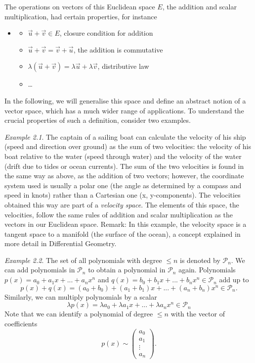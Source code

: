 \documentclass[
  letterpaper,
  DIV=11,
  numbers=noendperiod]{scrartcl}
\providecommand{\tightlist}{%
  \setlength{\itemsep}{0pt}\setlength{\parskip}{0pt}}
\theoremstyle{remark}
\begin{document}
The operations on vectors of this Euclidean space \(E\), the addition
and scalar multiplication, had certain properties, for instance

\begin{itemize}
\tightlist
\item
  \begin{itemize}
  \tightlist
  \item
    \(\vec{u} + \vec{v}  \in  E\), closure condition for addition
  \item
    \(\vec{u}+\vec{v}  =  \vec{v}+\vec{u}\), the addition is commutative
  \item
    \(\lambda (\vec{u}+ \vec{v})  =  \lambda \vec{u} + \lambda \vec{v}\),
    distributive law
  \item
    \ldots 
  \end{itemize}
\end{itemize}

In the following, we will generalise this space and define an abstract
notion of a vector space, which has a much wider range of applications.
To understand the crucial properties of such a definition, consider two
examples.

\emph{Example 2.1}. The captain of a sailing boat can calculate the
velocity of his ship (speed and direction over ground) as the sum of two
velocities: the velocity of his boat relative to the water (speed
through water) and the velocity of the water (drift due to tides or
ocean currents). The sum of the two velocities is found in the same way
as above, as the addition of two vectors; however, the coordinate system
used is usually a polar one (the angle as determined by a compass and
speed in knots) rather than a Cartesian one (x, y-components). The
velocities obtained this way are part of a \emph{velocity space}. The
elements of this space, the velocities, follow the same rules of
addition and scalar multiplication as the vectors in our Euclidean
space. Remark: In this example, the velocity space is a tangent space to
a manifold (the surface of the ocean), a concept explained in more
detail in Differential Geometry.

\emph{Example 2.2}. The set of all polynomials with degree \(\leq n\) is
denoted by \(\mathcal{P}_{n}\). We can add polynomials in
\(\mathcal{P}_{n}\) to obtain a polynomial in \(\mathcal{P}_{n}\) again.
Polynomials \(p(x)= a_{0} + a_{1}x + ...+a_{n} x^{n}\) and
\(q(x)= b_{0} + b_{1}x + ...+b_{n} x^{n}\)\(\in \mathcal{P}_{n}\) add up
to
\[p(x)+q(x)  =  (a_{0}+ b_{0}) + (a_{1} + b_{1}) x + ...+(a_{n}+ b_{n}) x^{n}   \in \mathcal{P}_{n} .\]
Similarly, we can multiply polynomials by a scalar
\[\lambda p(x)  =   \lambda a_{0} +  \lambda a_{1}x + ...+ \lambda a_{n} x^{n}  \in \mathcal{P}_{n}\]
Note that we can identify a polynomial of degree \(\leq n\) with the
vector of coefficients
\[p(x) \sim  \scriptstyle \begin{pmatrix}    a_{0} \\ a_{1} \\ \vdots \\ a_{n}   \end{pmatrix} \textstyle.\]
\end{document}
